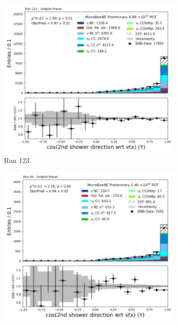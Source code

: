 \begin{figure}[H]
    \centering
    \begin{subfigure}[t]{0.32\linewidth}
        \includegraphics[width=\linewidth]{technote/Appendix_Preselection/Figures/1eNp0pi/Run123/secondshower_Y_dot_Run123_1eNp0pi_Presel.png}
        \caption{Run 123.}
    \end{subfigure}%
    \hspace{0.2cm}%
    \begin{subfigure}[t]{0.32\linewidth}
        \includegraphics[width=\linewidth]{technote/Appendix_Preselection/Figures/1eNp0pi/Run4b/secondshower_Y_dot_Run4b_1eNp0pi_Presel.png}

\end{subfigure}
\end{figure}
